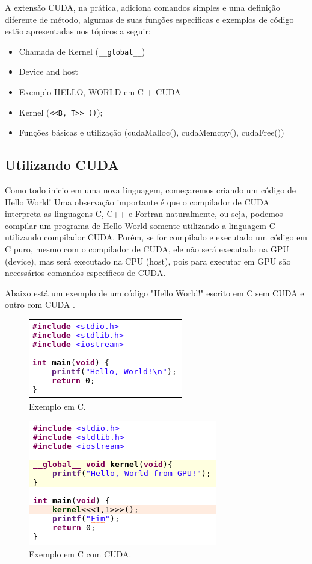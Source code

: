 \documentclass[12pt]{article}
\begin{document}
A extensão CUDA, na prática, adiciona comandos simples e uma definição diferente de método, algumas de suas funções especificas e exemplos de código estão apresentadas nos tópicos a seguir:
\begin{itemize}
  \item Chamada de Kernel (\verb|__global__|)
  \item Device and host 
  \item Exemplo HELLO, WORLD em C + CUDA 
  \item Kernel (\verb|<<B, T>> ()|); 
  \item Funções básicas e utilização (cudaMalloc(), cudaMemcpy(), cudaFree()) 
\end{itemize}
\subsection{Utilizando CUDA}
Como todo inicio em uma nova linguagem, começaremos criando um código de Hello World! Uma observação importante é que o compilador de CUDA interpreta as linguagens C, C++ e Fortran naturalmente, ou seja, podemos compilar um programa de Hello World somente utilizando a linguagem C utilizando compilador CUDA. Porém, se for compilado e executado um código em C puro, mesmo com o compilador de CUDA, ele não será executado na GPU (device), mas será executado na CPU (host), pois para executar em GPU são necessários comandos específicos de CUDA.

Abaixo está um exemplo de um código "Hello World!" escrito em C sem CUDA e outro com CUDA \cite{materialCUDA}.
\begin{figure}[H]
\centering
\includegraphics[width=.4\textwidth]{helloworldC.png}
\caption{Exemplo em C. }
\label{fig:figura4}
\end{figure}

\begin{figure}[H]
\centering
\includegraphics[width=.4\textwidth]{helloworldCUDA.png}
\caption{Exemplo em C com CUDA. }
\label{fig:figura5}
\end{figure}
\end{document}
